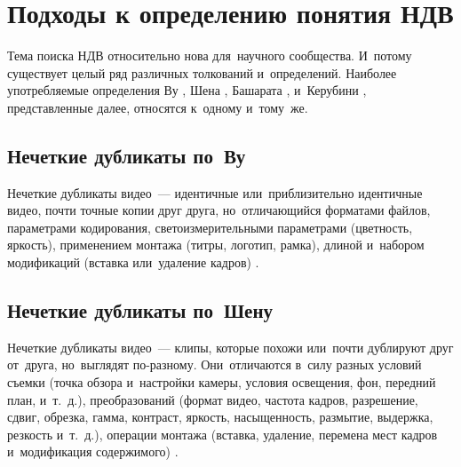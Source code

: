 

\section{Подходы к определению понятия НДВ}

Тема поиска НДВ относительно нова для~научного сообщества.
И~потому существует целый ряд различных толкований и~определений.
Наиболее употребляемые определения
Ву \cite{Wu:2007a}, Шена \cite{Shen:2007},
Башарата \cite{Basharat:2008}, и~Керубини \cite{Cherubini:2009},
представленные далее, относятся к~одному и~тому~же.

\subsection{Нечеткие дубликаты по~Ву}

Нечеткие дубликаты видео~— идентичные или~приблизительно идентичные видео,
почти точные копии друг друга,
но~отличающийся
    форматами файлов,
    параметрами кодирования,
    светоизмерительными параметрами (цветность, яркость),
    применением монтажа (титры, логотип, рамка),
    длиной
    и~набором модификаций (вставка или~удаление кадров) \cite{Wu:2007a}.



\subsection{Нечеткие дубликаты по~Шену}

Нечеткие дубликаты видео~— клипы,
которые похожи или~почти дублируют друг от~друга, но~выглядят по-разному.
Они~отличаются в~силу
    разных условий съемки
        (точка обзора и~настройки камеры, условия освещения,
        фон, передний план, и~т.~д.),
    преобразований
        (формат видео, частота кадров, разрешение, сдвиг, обрезка, гамма, контраст,
        яркость, насыщенность, размытие, выдержка, резкость и~т.~д.),
    операции монтажа
        (вставка, удаление, перемена мест кадров и~модификация содержимого)
    \cite{Shen:2007}.



